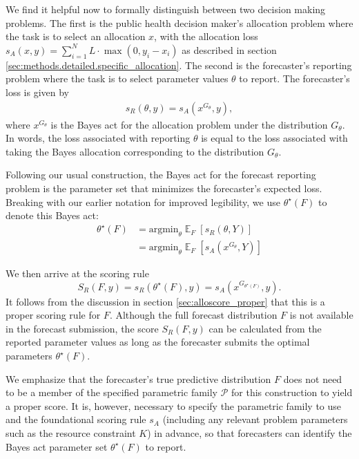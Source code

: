 \documentclass{article}\usepackage[]{graphicx}\usepackage[]{xcolor}
\DeclareMathOperator{\Ex}{\mathbb{E}}
\begin{document}
We find it helpful now to formally distinguish between two decision making problems. The first is the public health
decision maker's allocation problem where the task is to select an allocation $x$, with the allocation loss $s_A(x, y) =
\sum_{i=1}^N L \cdot \max(0, y_i - x_i)$ as described in section \ref{sec:methods.detailed.specific_allocation}. The
second is the forecaster's reporting problem where the task is to select parameter values $\theta$ to report. The
forecaster's loss is given by
\begin{align}
s_R(\theta, y) = s_A(x^{G_\theta}, y), \label{eqn:forecaster_theta_loss}
\end{align}
where $x^{G_\theta}$ is the Bayes act for the allocation problem under the distribution $G_\theta$. In words, the loss
associated with reporting $\theta$ is equal to the loss associated with taking the Bayes allocation corresponding to the
distribution $G_\theta$.

Following our usual construction, the Bayes act for the forecast reporting problem is the parameter set that minimizes
the forecaster's expected loss. Breaking with our earlier notation for improved legibility, we use $\theta^\star(F)$ to
denote this Bayes act:
\begin{align*}
\theta^\star(F) &= \text{argmin}_\theta \Ex_F [s_R(\theta, Y)] \\
&= \text{argmin}_\theta \Ex_F [s_A(x^{G_\theta}, Y)]
\end{align*}

We then arrive at the scoring rule
$$S_R(F, y) = s_R(\theta^\star(F), y) = s_A(x^{G_{\theta^\star(F)}}, y).$$
It follows from the discussion in section \ref{sec:alloscore_proper} that this is a proper scoring rule for $F$.
Although the full forecast distribution $F$ is not available in the forecast submission, the score $S_R(F, y)$ can be
calculated from the reported parameter values as long as the forecaster submits the optimal parameters
$\theta^\star(F)$.

We emphasize that the forecaster's true predictive distribution $F$ does not need to be a member of the specified
parametric family $\mathcal{P}$ for this construction to yield a proper score. It is, however, necessary to specify the
parametric family to use and the foundational scoring rule $s_A$ (including any relevant problem parameters such as the
resource constraint $K$) in advance, so that forecasters can identify the Bayes act parameter set $\theta^\star(F)$ to
report.
\end{document}
